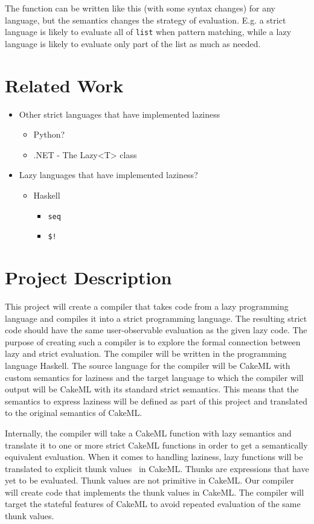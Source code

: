 \noindent The function can be written like this (with some syntax changes) for
any language, but the semantics
changes the strategy of evaluation. E.g. a strict language is likely to evaluate
all of \texttt{list} when pattern matching, while a lazy language is likely to
evaluate only part of the list as much as needed. 


\section{Related Work}
\label{intro:Related}
\begin{itemize}
\item Other strict languages that have implemented laziness
  \begin{itemize}
  \item Python?
  \item .NET - The Lazy<T> class
  \end{itemize}
\item Lazy languages that have implemented laziness?
  \begin{itemize}
  \item Haskell
    \begin{itemize}
    \item \texttt{seq}
    \item \texttt{\$!}
    \end{itemize}
  \end{itemize}
\end{itemize}


\section{Project Description}
This project will create a compiler that takes code from a lazy programming
language and compiles it into a strict programming language. The resulting
strict code should have the same user-observable evaluation as the given lazy
code. The purpose of creating such a compiler is to explore the formal
connection between lazy and strict evaluation. The compiler will be written in
the programming language Haskell. The source language for the compiler will be
CakeML with custom semantics for laziness and the target language to which
the compiler will output will be CakeML with its standard strict semantics. This
means that the semantics to express laziness will be defined as part of this
project and translated to the original semantics of CakeML.

Internally, the compiler will take a
CakeML function with lazy semantics and translate it to one
or more strict CakeML functions in order to get a semantically equivalent
evaluation. When it comes to handling laziness, lazy functions will be
translated to explicit thunk values~\cite{Ingerman:1961:TWC:366062.366084} in
CakeML. Thunks are expressions that have yet to be evaluated. Thunk values are
not primitive in CakeML. Our compiler will create code that
implements the thunk values in CakeML. The compiler will target the stateful
features of CakeML to avoid repeated evaluation of the same thunk values.

